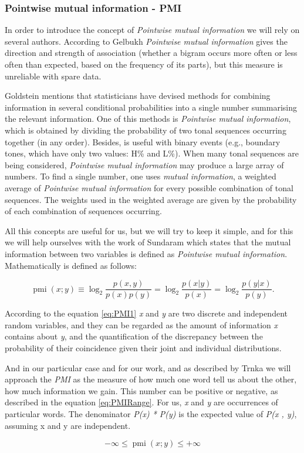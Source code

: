 \subsubsection{Pointwise mutual information - PMI}\label{PMI}

In order to introduce the concept of \emph{Pointwise mutual information} we will rely on several authors. According to Gelbukh \cite{G2009} \emph{Pointwise mutual information} gives the direction and strength of association (whether a bigram occurs more often or less often than expected, based on the frequency of its parts), but this measure is unreliable with spare data.

Goldstein \cite{G2006} mentions that statisticians have devised methods for combining information in several conditional probabilities into a single number summarising the relevant information. One of this methods is \emph{Pointwise mutual information}, which is obtained by dividing the probability of two tonal sequences occurring together (in any order). Besides, is useful with binary events (e.g., boundary tones, which have only two values: H\% and L\%). When many tonal sequences are being considered, \emph{Pointwise mutual information} may produce a large array of numbers. To find a single number, one uses \emph{mutual information}, a weighted average of \emph{Pointwise mutual information} for every possible combination of tonal sequences. The weights used in the weighted average are given by the probability of each combination of sequences occurring.

All this concepts are useful for us, but we will try to keep it simple, and for this we will help ourselves with the work of Sundaram \cite{SD2006} which states that the mutual information between two variables is defined as \emph{Pointwise mutual information}. Mathematically is defined as follows: 

\begin{equation} \label{eq:PMI1}
\operatorname{pmi}(x;y) \equiv \log_{2}\frac{p(x,y)}{p(x)p(y)} = \log_{2}\frac{p(x|y)}{p(x)} = \log_{2}\frac{p(y|x)}{p(y)}.
\end{equation}

According to the equation \ref{eq:PMI1} \emph{x} and \emph{y} are two discrete and independent random variables, and they can be regarded as the amount of information \emph{x} contains about \emph{y}, and the quantification of the discrepancy between the probability of their coincidence given their joint and individual distributions.

And in our particular case and for our work, and as described by Trnka \cite{TR2011} we will approach the \emph{PMI} as the measure of how much one word tell us about the other, how much information we gain. This number can be positive or negative, as described in the equation \ref{eq:PMIRange}. For us, \emph{x} and \emph{y} are occurrences of particular words. The denominator \emph{P(x) * P(y)} is the expected value of \emph{P(x , y)}, assuming x and y are independent. 

\begin{equation} \label{eq:PMIRange}
	-\infty \leq \operatorname{pmi}(x;y) \leq +\infty
\end{equation}